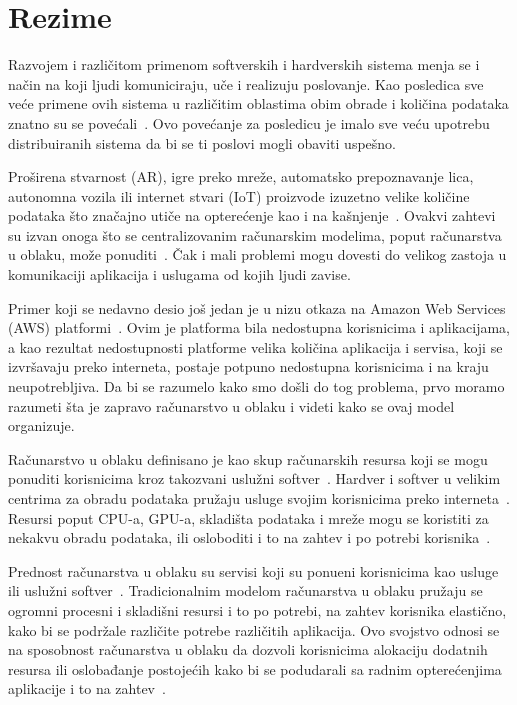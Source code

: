 \chapter*{Rezime}
\pagestyle{plain}

Razvojem i razli\v citom primenom softverskih i hardverskih sistema menja se i na\v cin na koji ljudi komuniciraju, u\v ce i realizuju poslovanje. Kao posledica sve ve\'ce primene ovih sistema u razli\v citim oblastima obim obrade i koli\v cina podataka znatno su se pove\'cali~\cite{ChiangZ16}. Ovo pove\'canje za posledicu je imalo sve ve\'cu upotrebu distribuiranih sistema da bi se ti poslovi mogli obaviti uspe\v sno.

Pro\v sirena stvarnost (AR), igre preko mre\v ze, automatsko prepoznavanje lica, autonomna vozila ili internet stvari (IoT) proizvode izuzetno velike koli\v cine podataka \v sto zna\v cajno uti\v ce na opterećenje kao i na ka\v snjenje~\cite{ChiangZ16}. Ovakvi zahtevi su izvan onoga \v sto se centralizovanim ra\v cunarskim modelima, poput ra\v cunarstva u oblaku, mo\v ze ponuditi~\cite{ChiangZ16}. \v Cak i mali problemi mogu dovesti do velikog zastoja u komunikaciji aplikacija i uslugama od kojih ljudi zavise.  

Primer koji se nedavno desio jo\v s jedan je u nizu otkaza na Amazon Web Services (AWS) platformi~\cite{GunawiHSLSAE16}. Ovim je platforma bila nedostupna korisnicima i aplikacijama, a kao rezultat nedostupnosti platforme velika koli\v cina aplikacija i servisa, koji se izvr\v savaju preko interneta, postaje potpuno nedostupna korisnicima i na kraju neupotrebljiva. Da bi se razumelo kako smo do\v sli do tog problema, prvo moramo razumeti \v sta je zapravo ra\v cunarstvo u oblaku i videti kako se ovaj model organizuje.

Ra\v cunarstvo u oblaku definisano je kao skup ra\v cunarskih resursa koji se mogu ponuditi korisnicima kroz takozvani uslu\v zni softver~\cite{Vogels}. Hardver i softver u velikim centrima za obradu podataka pru\v zaju usluge svojim korisnicima preko interneta~\cite {AboveTheCloud}. Resursi poput CPU-a, GPU-a, skladi\v sta podataka i mre\v ze mogu se koristiti za nekakvu obradu podataka, ili osloboditi i to na zahtev i po potrebi korisnika~\cite{ZhangCB10}. 

Prednost ra\v cunarstva u oblaku su servisi koji su ponu\dj eni korisnicima kao usluge ili uslu\v zni softver~\cite{Vogels}. Tradicionalnim modelom ra\v cunarstva u oblaku pružaju se ogromni procesni i skladi\v sni resursi i to po potrebi, na zahtev korisnika elasti\v cno, kako bi se podr\v zale razli\v cite potrebe razli\v citih aplikacija. Ovo svojstvo odnosi se na sposobnost ra\v cunarstva u oblaku da dozvoli korisnicima alokaciju dodatnih resursa ili oslobađanje postoje\'cih kako bi se podudarali sa radnim optere\'cenjima aplikacije i to na zahtev~\cite{AssuncaoVB18}. 

